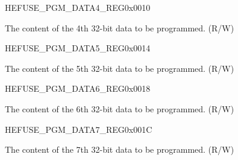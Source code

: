 \begin{register}{H}{EFUSE\_PGM\_DATA4\_REG}{0x0010}\label{regdesc:EFUSEPGMDATA4REG}
%
\regnewline%
\begin{regdesc}\begin{reglist}
\label{fielddesc:EFUSEPGMDATA4}\item [EFUSE\_PGM\_DATA\_4] The content of the 4th 32-bit data to be programmed. (R/W)
\end{reglist}\end{regdesc}
\end{register}


\begin{register}{H}{EFUSE\_PGM\_DATA5\_REG}{0x0014}\label{regdesc:EFUSEPGMDATA5REG}
%
\regnewline%
\begin{regdesc}\begin{reglist}
\label{fielddesc:EFUSEPGMDATA5}\item [EFUSE\_PGM\_DATA\_5] The content of the 5th 32-bit data to be programmed. (R/W)
\end{reglist}\end{regdesc}
\end{register}


\begin{register}{H}{EFUSE\_PGM\_DATA6\_REG}{0x0018}\label{regdesc:EFUSEPGMDATA6REG}
%
\regnewline%
\begin{regdesc}\begin{reglist}
\label{fielddesc:EFUSEPGMDATA6}\item [EFUSE\_PGM\_DATA\_6] The content of the 6th 32-bit data to be programmed. (R/W)
\end{reglist}\end{regdesc}
\end{register}


\begin{register}{H}{EFUSE\_PGM\_DATA7\_REG}{0x001C}\label{regdesc:EFUSEPGMDATA7REG}
%
\regnewline%
\begin{regdesc}\begin{reglist}
\label{fielddesc:EFUSEPGMDATA7}\item [EFUSE\_PGM\_DATA\_7] The content of the 7th 32-bit data to be programmed. (R/W)
\end{reglist}\end{regdesc}
\end{register}


